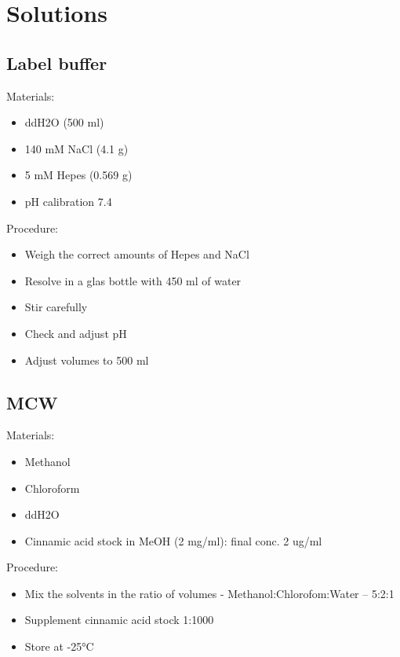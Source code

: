 \documentclass[]{book}
\providecommand{\tightlist}{%
  \setlength{\itemsep}{0pt}\setlength{\parskip}{0pt}}
\begin{document}
\hypertarget{solutions}{%
\section{Solutions}\label{solutions}}

\hypertarget{washingbuffer}{%
\subsection{Label buffer}\label{washingbuffer}}

Materials:

\begin{itemize}
\tightlist
\item
  ddH2O (500 ml)
\item
  140 mM NaCl (4.1 g)
\item
  5 mM Hepes (0.569 g)
\item
  pH calibration 7.4
\end{itemize}

Procedure:

\begin{itemize}
\tightlist
\item
  Weigh the correct amounts of Hepes and NaCl
\item
  Resolve in a glas bottle with 450 ml of water
\item
  Stir carefully
\item
  Check and adjust pH
\item
  Adjust volumes to 500 ml
\end{itemize}

\hypertarget{mcw}{%
\subsection{MCW}\label{mcw}}

Materials:

\begin{itemize}
\tightlist
\item
  Methanol
\item
  Chloroform
\item
  ddH2O
\item
  Cinnamic acid stock in MeOH (2 mg/ml): final conc. 2 ug/ml
\end{itemize}

Procedure:

\begin{itemize}
\tightlist
\item
  Mix the solvents in the ratio of volumes - Methanol:Chlorofom:Water -- 5:2:1
\item
  Supplement cinnamic acid stock 1:1000
\item
  Store at -25°C
\end{itemize}
\end{document}
